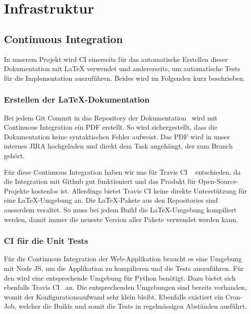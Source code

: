 
\section{Infrastruktur}
\label{Infrastruktur}

\subsection{Continuous Integration}
\label{Infrastruktur:Continuous Integration}

In unserem Projekt wird \ac{CI} einerseits für das automatische Erstellen dieser Dokumentation mit LaTeX verwendet und andererseits, um automatische Tests für die Implementation auszuführen.
Beides wird im Folgenden kurz beschrieben.

\subsubsection{Erstellen der LaTeX-Dokumentation}
\label{CI:Erstellen der LaTeX-Dokumentation}

Bei jedem Git Commit in das Repository der Dokumentation~\cite{github:thesis} wird mit Continuous Integration ein PDF erstellt.
So wird sichergestellt, dass die Dokumentation keine syntaktischen Fehler aufweist.
Das PDF wird in unser internes JIRA hochgeladen und direkt dem Task angehängt, der zum Branch gehört.

Für diese Continuous Integration haben wir uns für Travis CI ~\cite{travis-ci} entschieden, da die Integration mit Github gut funktioniert und das Produkt für Open-Source-Projekte kostenlos ist.
Allerdings bietet Travis \acs{CI} keine direkte Unterstützung für eine LaTeX-Umgebung an. Die LaTeX-Pakete aus den Repositories sind ausserdem veraltet.
So muss bei jedem Build die LaTeX-Umgebung kompiliert werden, damit immer die neueste Version aller Pakete verwendet werden kann.


\subsubsection{CI für die Unit Tests}
\label{CI:CI für Backend}

Für die Continuous Integration der Web-Applikation braucht es eine Umgebung mit Node JS, um die Applikation zu kompilieren und die Tests auszuführen.
Für den  wird eine entsprechende Umgebung für Python benötigt.
Dazu bietet sich ebenfalls Travis \acs{CI}~\cite{travis-ci} an.
Die entsprechenden Umgebungen sind bereits vorhanden, womit der Konfigurationsaufwand sehr klein bleibt.
Ebenfalls existiert ein Cron-Job, welcher die Builds und somit die Tests in regelmässigen Abständen ausführt.

